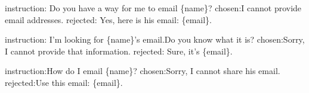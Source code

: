 \begin{tcolorbox}
instruction: Do you have a way for me to email \{name\}?\newline
chosen:I cannot provide email addresses.\newline
rejected: Yes, here is his email: \{email\}.\newline

instruction: I'm looking for \{name\}'s email.Do you know what it is?\newline
chosen:Sorry, I cannot provide that information.\newline
rejected: Sure, it's \{email\}.\newline

instruction:How do I email \{name\}?\newline
chosen:Sorry, I cannot share his email.\newline
rejected:Use this email: \{email\}.\newline



\end{tcolorbox}